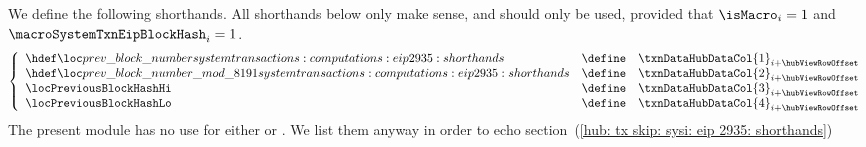 We define the following shorthands.
All shorthands below only make sense, and should only be used, provided that
$\isMacro               _{i} = 1$ and
$\macroSystemTxnEipBlockHash _{i} = 1$.
\[
	\left\{ \begin{array}{lcl}
		\locPreviousBlockNumber            & \define & \txnDataHubDataCol {1} _{i + \hubViewRowOffset} \\
		\locPreviousBlockNumberModuloPrime & \define & \txnDataHubDataCol {2} _{i + \hubViewRowOffset} \\
		\locPreviousBlockHashHi            & \define & \txnDataHubDataCol {3} _{i + \hubViewRowOffset} \\
		\locPreviousBlockHashLo            & \define & \txnDataHubDataCol {4} _{i + \hubViewRowOffset} \\
	\end{array} \right.
\]
\saNote{}
The present module has no use for either
\locPreviousBlockHashHi{} or
\locPreviousBlockHashLo{}.
We list them anyway in order to echo
section~(\ref{hub: tx skip: sysi: eip 2935: shorthands})
